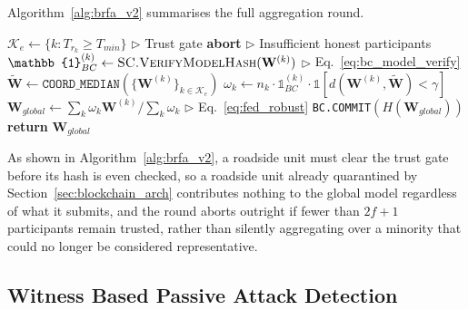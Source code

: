 \documentclass[final,5p,twocolumn]{elsarticle}
\renewcommand{\Comment}[1]{\hfill$\triangleright$ #1}
\theoremstyle{remark}
\theoremstyle{plain}
\begin{document}
Algorithm~\ref{alg:brfa_v2} summarises the full aggregation round.
\begin{algorithm}[!t]
	\caption{Byzantine Robust Federated Aggregation (BRFA-v2)}
	\label{alg:brfa_v2}
	\begin{algorithmic}[1]
		\small
		\State $\mathcal{K}_e \gets \{k : T_{r_k} \geq T_{min}\}$ \Comment{Trust gate}
		\State \textbf{abort} \Comment{Insufficient honest participants}
		\EndIf
		\State $\mathbb{1}_{BC}^{(k)} \gets \textsc{SC.VerifyModelHash}(\mathbf{W}^{(k)})$ \Comment{Eq.~\eqref{eq:bc_model_verify}}
		\EndFor
		\State $\tilde{\mathbf{W}} \gets \texttt{COORD\_MEDIAN}(\{\mathbf{W}^{(k)}\}_{k \in \mathcal{K}_e})$
		\State $\omega_k \gets n_k \cdot \mathbb{1}_{BC}^{(k)} \cdot \mathbb{1}[d(\mathbf{W}^{(k)}, \tilde{\mathbf{W}}) < \gamma]$
		\EndFor
		\State $\mathbf{W}_{global} \gets \sum_k \omega_k \mathbf{W}^{(k)} / \sum_k \omega_k$ \Comment{Eq.~\eqref{eq:fed_robust}}
		\State \texttt{BC.COMMIT}$(H(\mathbf{W}_{global}))$
		\State \textbf{return} $\mathbf{W}_{global}$
		\EndProcedure
	\end{algorithmic}
\end{algorithm}
As shown in Algorithm~\ref{alg:brfa_v2}, a roadside unit must clear the trust
gate before its hash is even checked, so a roadside unit already quarantined
by Section~\ref{sec:blockchain_arch} contributes nothing to the global
model regardless of what it submits, and the round aborts outright if fewer
than $2f{+}1$ participants remain trusted, rather than silently aggregating
over a minority that could no longer be considered representative.


\subsection{Witness Based Passive Attack Detection}
\label{sec:witness}
\end{document}

